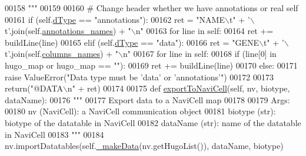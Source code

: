 \begin{DoxyCode}
00158 \textcolor{stringliteral}{        """}
00159 
00160         \textcolor{comment}{# Change header whether we have annotations or real self}
00161         \textcolor{keywordflow}{if} (self.\hyperlink{classnavicom_1_1navidata_1_1NaviData_a89cf0727f26dba8aabb38271d85b169d}{dType} == \textcolor{stringliteral}{"annotations"}):
00162             ret = \textcolor{stringliteral}{"NAME\(\backslash\)t"} + \textcolor{stringliteral}{'\(\backslash\)t'}.join(self.\hyperlink{classnavicom_1_1navidata_1_1NaviData_aae9bfcdefa67abad304df58b7e4a62c8}{annotations_names}) + \textcolor{stringliteral}{"\(\backslash\)n"}
00163             \textcolor{keywordflow}{for} line \textcolor{keywordflow}{in} self:
00164                 ret += buildLine(line)
00165         \textcolor{keywordflow}{elif} (self.\hyperlink{classnavicom_1_1navidata_1_1NaviData_a89cf0727f26dba8aabb38271d85b169d}{dType} == \textcolor{stringliteral}{"data"}):
00166             ret = \textcolor{stringliteral}{"GENE\(\backslash\)t"} + \textcolor{stringliteral}{'\(\backslash\)t'}.join(self.\hyperlink{classnavicom_1_1navidata_1_1NaviData_aebce9bba220d01776cbd5a214d2d3013}{columns_names}) + \textcolor{stringliteral}{"\(\backslash\)n"}
00167             \textcolor{keywordflow}{for} line \textcolor{keywordflow}{in} self:
00168                 \textcolor{keywordflow}{if} (line[0] \textcolor{keywordflow}{in} hugo\_map \textcolor{keywordflow}{or} hugo\_map == \textcolor{stringliteral}{""}):
00169                     ret += buildLine(line)
00170         \textcolor{keywordflow}{else}:
00171             \textcolor{keywordflow}{raise} ValueError(\textcolor{stringliteral}{"Data type must be 'data' or 'annotations'"})
00172 
00173         \textcolor{keywordflow}{return}(\textcolor{stringliteral}{"@DATA\(\backslash\)n"} + ret)
00174 
00175     \textcolor{keyword}{def }\hyperlink{classnavicom_1_1navidata_1_1NaviData_a485fbc0ffff49b94f3736b2a0f8cb54e}{exportToNaviCell}(self, nv, biotype, dataName):
00176         \textcolor{stringliteral}{"""}
00177 \textcolor{stringliteral}{        Export data to a NaviCell map}
00178 \textcolor{stringliteral}{        }
00179 \textcolor{stringliteral}{        Args:}
00180 \textcolor{stringliteral}{            nv (NaviCell): a NaviCell communication object}
00181 \textcolor{stringliteral}{            biotype (str): biotype of the datatable in NaviCell}
00182 \textcolor{stringliteral}{            dataName (str): name of the datatable in NaviCell}
00183 \textcolor{stringliteral}{        """}
00184         nv.importDatatables(self.\hyperlink{classnavicom_1_1navidata_1_1NaviData_a26d914914312eb5cceb517eb41128056}{_makeData}(nv.getHugoList()), dataName, biotype) 

\end{DoxyCode}

